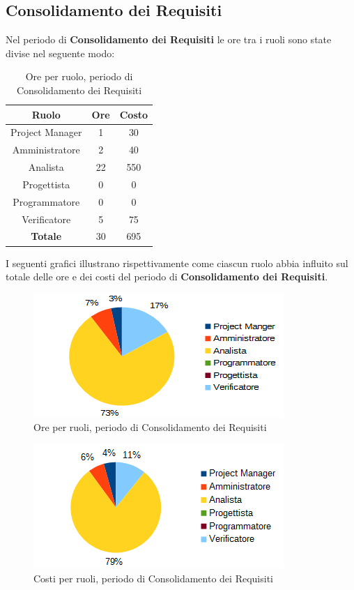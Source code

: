 	\subsection{Consolidamento dei Requisiti}
	Nel periodo di \textbf{Consolidamento dei Requisiti} le ore tra i ruoli sono state divise nel seguente modo: \\
	\begin{table}[H]
		\centering
		\begin{tabular}{|c|c|c|}
			\hline
			\textbf{Ruolo}		& \textbf{Ore}	& \textbf{Costo} \\
			\hline
			Project Manager		& 1				& 30	\\
			Amministratore		& 2				& 40	\\
			Analista			& 22			& 550	\\
			Progettista			& 0				& 0	\\
			Programmatore		& 0				& 0	\\
			Verificatore		& 5				& 75	\\
			\hline
			\textbf{Totale}		& 30			& 695	\\
			\hline
		\end{tabular}
		\caption{Ore per ruolo, periodo di Consolidamento dei Requisiti}
		\end{table}
	I seguenti grafici illustrano rispettivamente come ciascun ruolo abbia influito sul totale
delle ore e dei costi del periodo di \textbf{Consolidamento dei Requisiti}. \\
	\begin{figure}[H]
		\centering
		\includegraphics[scale=1]{immagini/grafici/analisi_dettaglio-torta.png}
		\caption{Ore per ruoli, periodo di Consolidamento dei Requisiti}
	\end{figure}
	\begin{figure}[H]
		\centering
		\includegraphics[scale=1]{immagini/grafici/analisi_dettaglio-torta-costo.png}
		\caption{Costi per ruoli, periodo di Consolidamento dei Requisiti}
	\end{figure}
